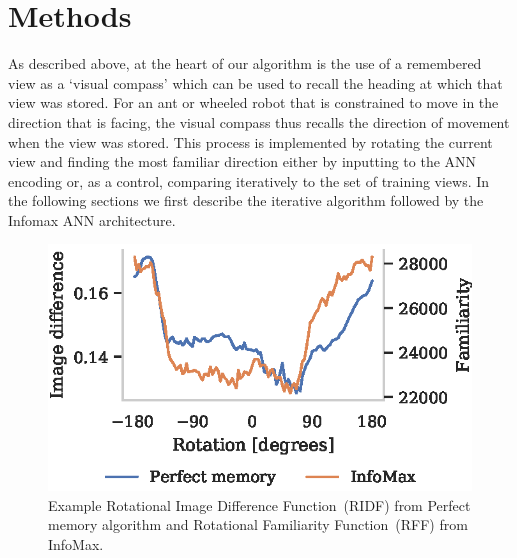 \documentclass[letterpaper]{article}
\begin{document}
\section{Methods}
As described above, at the heart of our algorithm is the use of a remembered view as a `visual compass' which can be used to recall the heading at which that view was stored. 
For an ant or wheeled robot that is constrained to move in the direction that is facing, the visual compass thus recalls the direction of movement when the view was stored. 
This process is implemented by rotating the current view and finding the most familiar direction either by inputting to the ANN encoding or, as a control, comparing iteratively to the set of training views. 
In the following sections we first describe the iterative algorithm followed by the Infomax ANN architecture.

\begin{figure}[t]
    \centering
    \includegraphics{figures/good_ridf.eps}
    \caption{Example Rotational Image Difference Function~(RIDF) from Perfect memory algorithm and Rotational Familiarity Function~(RFF) from InfoMax.}
    \label{fig:good_ridf}
\end{figure}
\end{document}

